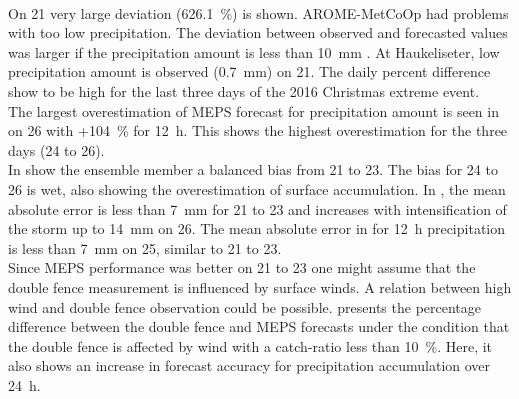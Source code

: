 \noindent
\\
On \SI{21}{\dec} very large deviation (\SI{626.1}{\percent}) is shown. 
AROME-MetCoOp had problems with too low precipitation. The deviation between observed and forecasted values was larger if the precipitation amount is less than \SI{10}{\mm} \citep{muller_arome-metcoop:_2017}. At Haukeliseter, low precipitation amount is observed (\SI{0.7}{\mm}) on \SI{21}{\dec}.
The daily percent difference show to be high for the last three days of the 2016 Christmas extreme event.  
\\
The largest overestimation of MEPS forecast for precipitation amount is seen in  on \SI{26}{\dec} with +\SI{104}{\percent} for \SI{12}{\hour}. This shows the highest overestimation for the three days (\num{24} to \SI{26}{\dec}).
\\
In  show the ensemble member a balanced bias from \num{21} to \SI{23}{\dec}. The bias for \num{24} to \SI{26}{\dec} is wet, also showing the overestimation of surface accumulation.
In , the mean absolute error is less than \SI{7}{\mm} for \num{21} to \SI{23}{\dec} and increases with intensification of the storm up to \SI{14}{\mm} on \SI{26}{\dec}. The mean absolute error in  for \SI{12}{\hour} precipitation is less than \SI{7}{\mm} on \SI{25}{\dec}, similar to \num{21} to \SI{23}{\dec}.
\\
Since MEPS performance was better on \num{21} to \SI{23}{\dec} one might assume that the double fence measurement is influenced by surface winds. 
A relation between high wind and double fence observation could be possible.  presents the percentage difference between the double fence and MEPS forecasts under the condition that the double fence is affected by wind with a catch-ratio less than \SI{10}{\percent}. Here, it also shows an increase in forecast accuracy for precipitation accumulation over \SI{24}{\hour}.
